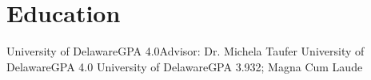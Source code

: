 \section{Education}
		{University of Delaware}{GPA 4.0}{}{Advisor: Dr. Michela Taufer}
		{University of Delaware}{GPA 4.0}{}{}
		{University of Delaware}{}{}{GPA 3.932; Magna Cum Laude}

